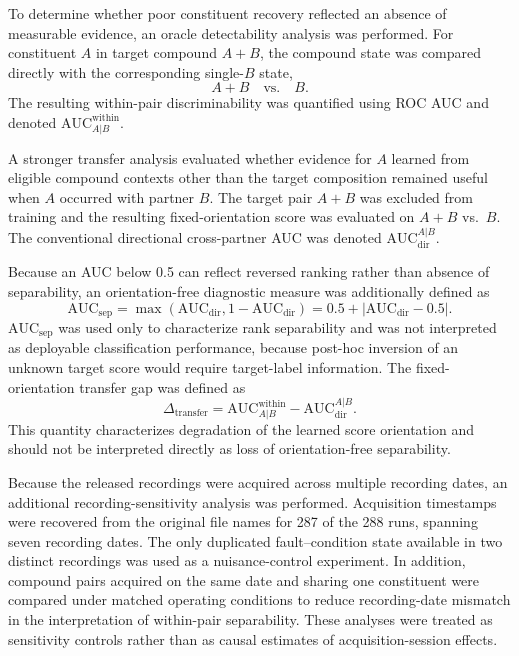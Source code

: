 To determine whether poor constituent recovery reflected an absence of
measurable evidence, an oracle detectability analysis was performed. For
constituent $A$ in target compound $A{+}B$, the compound state was compared
directly with the corresponding single-$B$ state,
\begin{equation}
A{+}B \quad \text{vs.} \quad B.
\end{equation}
The resulting within-pair discriminability was quantified using ROC AUC and
denoted $\mathrm{AUC}^{\mathrm{within}}_{A|B}$.

A stronger transfer analysis evaluated whether evidence for $A$ learned
from eligible compound contexts other than the target composition remained
useful when $A$ occurred with partner $B$. The target pair $A{+}B$ was
excluded from training and the resulting fixed-orientation score was
evaluated on $A{+}B$ vs.\ $B$. The conventional directional cross-partner
AUC was denoted $\mathrm{AUC}^{A|B}_{\mathrm{dir}}$.

Because an AUC below 0.5 can reflect reversed ranking rather than absence
of separability, an orientation-free diagnostic measure was additionally
defined as
\begin{equation}
\mathrm{AUC}_{\mathrm{sep}} =
\max\left(\mathrm{AUC}_{\mathrm{dir}}, 1 - \mathrm{AUC}_{\mathrm{dir}}\right)
= 0.5 + \left|\mathrm{AUC}_{\mathrm{dir}} - 0.5\right|.
\label{eq:aucsep}
\end{equation}
$\mathrm{AUC}_{\mathrm{sep}}$ was used only to characterize rank
separability and was not interpreted as deployable classification
performance, because post-hoc inversion of an unknown target score would
require target-label information. The fixed-orientation transfer gap was
defined as
\begin{equation}
\Delta_{\mathrm{transfer}} =
\mathrm{AUC}^{\mathrm{within}}_{A|B} - \mathrm{AUC}^{A|B}_{\mathrm{dir}}.
\end{equation}
This quantity characterizes degradation of the learned score orientation
and should not be interpreted directly as loss of orientation-free
separability.

Because the released recordings were acquired across multiple recording
dates, an additional recording-sensitivity analysis was performed.
Acquisition timestamps were recovered from the original file names for 287
of the 288 runs, spanning seven recording dates. The only duplicated
fault--condition state available in two distinct recordings was used as a
nuisance-control experiment. In addition, compound pairs acquired on the
same date and sharing one constituent were compared under matched operating
conditions to reduce recording-date mismatch in the interpretation of
within-pair separability. These analyses were treated as sensitivity
controls rather than as causal estimates of acquisition-session effects.

